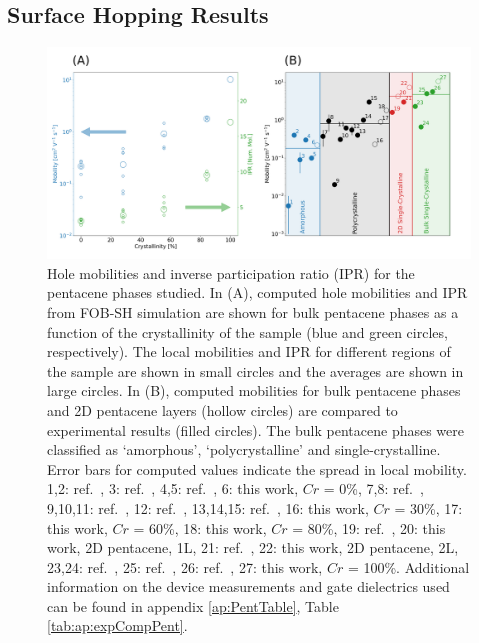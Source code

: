 \subsection{Surface Hopping Results}
\begin{figure}[htp] 
  \includegraphics[width=\textwidth]{./img/DifferentQuenchTimes/mobilities.png}
  \caption{\label{fig:mobilities}Hole mobilities and inverse participation ratio (IPR) for the pentacene phases studied.  
 In (A), computed hole mobilities and IPR from FOB-SH simulation are shown for bulk pentacene phases 
 as a function of the crystallinity of the sample (blue and green circles, respectively). The local mobilities and IPR for different regions of the sample are shown in 
	small circles and the averages are shown in large circles. In (B), computed mobilities for bulk pentacene phases and 2D pentacene layers (hollow circles) 
 are compared to experimental results (filled circles). The bulk pentacene phases were classified as `amorphous', `polycrystalline' and single-crystalline. 
 Error bars for computed values indicate the spread in local mobility.  
 1,2: ref.~\cite{AmorphPentPumpProbe}, 
 3: ref.~\cite{BAE201398}, 
 4,5: ref.~\cite{AmorphPentTransportDodgy},
 6: this work, $Cr$ = 0\%,
 7,8: ref.~\cite{KNIPP2004595},
 9,10,11: ref.~\cite{Fritz2005},
 12: ref.~\cite{Duffy2008}, 
 13,14,15: ref.~\cite{Klauk02},
 16: this work, $Cr$ = 30\%,
 17: this work, $Cr$ = 60\%,
 18:  this work,  $Cr$ = 80\%,
 19: ref.~\cite{Zhang2016TF},
  20: this work, 2D pentacene, 1L,
 21: ref.~\cite{Zhang2016TF},
 22:  this work, 2D pentacene, 2L,
 23,24: ref.~\cite{Lee2006}, 
 25: ref.~\cite{Takeyama2012_PentCryst},
 26: ref.~\cite{Arabi2016},
 27: this work, $Cr$ = 100\%.  
	Additional information on the device measurements and gate dielectrics used can be found in appendix \ref{ap:PentTable}, Table \ref{tab:ap:expCompPent}.}
\end{figure}
